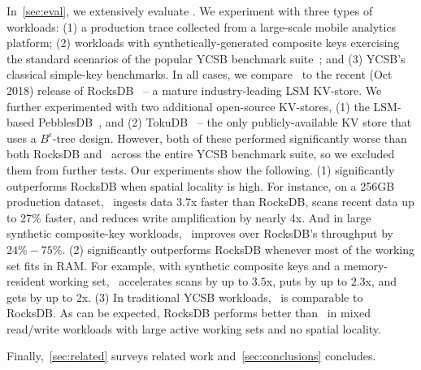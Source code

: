 In~\cref{sec:eval}, we extensively evaluate \sys. 
We experiment with three types of workloads: (1) a production trace collected from a large-scale mobile analytics platform; 
(2)  workloads with synthetically-generated composite keys exercising the standard scenarios of the popular YCSB benchmark suite~\cite{YCSB};
and (3)  YCSB's classical simple-key benchmarks.  
In all cases, we compare \sys\ to the recent (Oct 2018) release of RocksDB~\cite{RocksDB} -- a mature industry-leading LSM KV-store. 
We further experimented with two additional open-source KV-stores, (1) the LSM-based PebblesDB~\cite{PebblesDB}, and (2) TokuDB~\cite{} -- the only
publicly-available KV store that uses a $B^{\epsilon}$-tree design. However, both of these performed significantly worse than both RocksDB and \sys\ across 
the entire YCSB benchmark suite, so we excluded them from further tests. 
%
Our experiments show the following. (1) \sys\/ significantly outperforms RocksDB when spatial  locality is high.  
For instance, on a 256GB production dataset, \sys\ ingests data 3.7x faster than RocksDB,  scans recent  data up to 27\% faster, 
and reduces write amplification by nearly 4x. 
And in large synthetic composite-key workloads, \sys\  improves over RocksDB's throughput by $24\% - 75\%$. 
(2) \sys\/ significantly outperforms RocksDB whenever most of the working set fits in RAM. 
For example, with synthetic composite keys and a memory-resident 
working set, \sys\  accelerates scans by up to $3.5$x, puts by up to $2.3$x, and gets by up to $2$x. 
(3) In traditional YCSB workloads,  \sys\ is comparable to RocksDB. As can be expected, RocksDB performs better than 
\sys\ in mixed read/write workloads with large active working sets and no spatial locality. 


Finally,~\cref{sec:related}  surveys related work and~\cref{sec:conclusions} concludes. 
